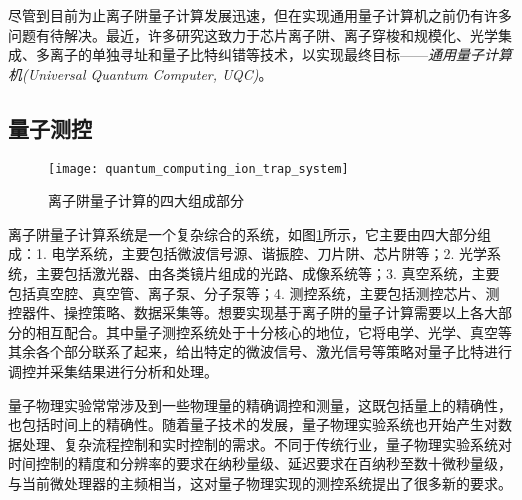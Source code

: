尽管到目前为止离子阱量子计算发展迅速，但在实现通用量子计算机之前仍有许多问题有待解决。最近，许多研究这致力于芯片离子阱\cite[]{Mehta_Eltony_Bruzewicz_Chuang_Ram_Sage_Chiaverini_2014}、离子穿梭和规模化\cite[]{Monroe_Kim_2013, Sterling_Rattanasonti_Weidt_Lake_Srinivasan_Webster_Kraft_Hensinger_2014, Lee_Jeong_Park_Jung_Kim_Cho_2021}、光学集成\cite[]{Niffenegger_Stuart_Sorace_Agaskar_Kharas_Bramhavar_Bruzewicz_Loh_Maxson_McConnell_Reens_et_al_2020, Mehta_Zhang_Malinowski_Nguyen_Stadler_Home_2020}、多离子的单独寻址\cite[]{Ivory_Setzer_Karl_McGuinness_DeRose_Blain_Stick_Gehl_Parazzoli_2020}和量子比特纠错\cite[]{Cramer_Kalb_Rol_Hensen_Blok_Markham_Twitchen_Hanson_Taminiau_2016,Reichardt_2021}等技术，以实现最终目标——\emph{通用量子计算机(Universal Quantum Computer, UQC)}。

\subsection[量子测控]{量子测控}

\begin{figure}
    \centering
    \caption[离子阱量子计算的组成]{离子阱量子计算的四大组成部分\label{fig:quantum_computing_ion_trap_system}}
    \texttt{[image: quantum\_computing\_ion\_trap\_system]}
\end{figure}
离子阱量子计算系统是一个复杂综合的系统，如图\ref{fig:quantum_computing_ion_trap_system}所示，它主要由四大部分组成：1.  电学系统，主要包括微波信号源、谐振腔、刀片阱、芯片阱等；2. 光学系统，主要包括激光器、由各类镜片组成的光路、成像系统等；3. 真空系统，主要包括真空腔、真空管、离子泵、分子泵等；4. 测控系统，主要包括测控芯片、测控器件、操控策略、数据采集等。想要实现基于离子阱的量子计算需要以上各大部分的相互配合。其中量子测控系统处于十分核心的地位，它将电学、光学、真空等其余各个部分联系了起来，给出特定的微波信号、激光信号等策略对量子比特进行调控并采集结果进行分析和处理。

量子物理实验常常涉及到一些物理量的精确调控和测量，这既包括量上的精确性，也包括时间上的精确性。随着量子技术的发展，量子物理实验系统也开始产生对数据处理、复杂流程控制和实时控制的需求。不同于传统行业，量子物理实验系统对时间控制的精度和分辨率的要求在纳秒量级、延迟要求在百纳秒至数十微秒量级，与当前微处理器的主频相当，这对量子物理实现的测控系统提出了很多新的要求。

